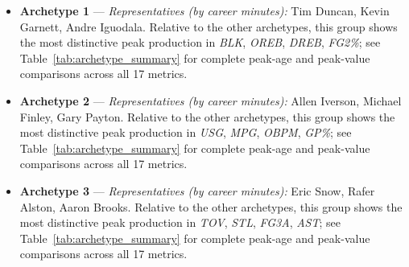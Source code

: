 \begin{itemize}
\item \textbf{Archetype 1} --- \emph{Representatives (by career minutes):} Tim Duncan, Kevin Garnett, Andre Iguodala. Relative to the other archetypes, this group shows the most distinctive peak production in \textit{BLK}, \textit{OREB}, \textit{DREB}, \textit{FG2\%}; see Table~\ref{tab:archetype_summary} for complete peak-age and peak-value comparisons across all 17 metrics.
\item \textbf{Archetype 2} --- \emph{Representatives (by career minutes):} Allen Iverson, Michael Finley, Gary Payton. Relative to the other archetypes, this group shows the most distinctive peak production in \textit{USG}, \textit{MPG}, \textit{OBPM}, \textit{GP\%}; see Table~\ref{tab:archetype_summary} for complete peak-age and peak-value comparisons across all 17 metrics.
\item \textbf{Archetype 3} --- \emph{Representatives (by career minutes):} Eric Snow, Rafer Alston, Aaron Brooks. Relative to the other archetypes, this group shows the most distinctive peak production in \textit{TOV}, \textit{STL}, \textit{FG3A}, \textit{AST}; see Table~\ref{tab:archetype_summary} for complete peak-age and peak-value comparisons across all 17 metrics.
\end{itemize}
